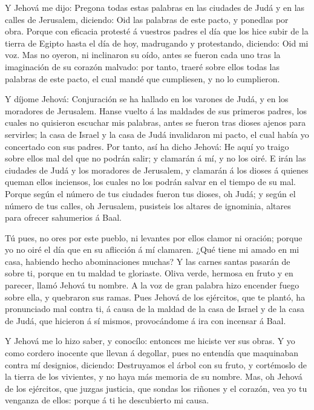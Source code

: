  Y Jehová me dijo: Pregona todas estas palabras en las
ciudades de Judá y en las calles de Jerusalem, diciendo: Oid las
palabras de este pacto, y ponedlas por obra.  Porque con
eficacia protesté á vuestros padres el día que los hice subir de la
tierra de Egipto hasta el día de hoy, madrugando y protestando,
diciendo: Oid mi voz.  Mas no oyeron, ni inclinaron su oído,
antes se fueron cada uno tras la imaginación de su corazón malvado: por
tanto, traeré sobre ellos todas las palabras de este pacto, el cual
mandé que cumpliesen, y no lo cumplieron.

 Y díjome Jehová: Conjuración se ha hallado en los varones
de Judá, y en los moradores de Jerusalem.  Hanse vuelto á
las maldades de sus primeros padres, los cuales no quisieron escuchar
mis palabras, antes se fueron tras dioses ajenos para servirles; la casa
de Israel y la casa de Judá invalidaron mi pacto, el cual había yo
concertado con sus padres.  Por tanto, así ha dicho Jehová:
He aquí yo traigo sobre ellos mal del que no podrán salir; y clamarán á
mí, y no los oiré.  E irán las ciudades de Judá y los
moradores de Jerusalem, y clamarán á los dioses á quienes queman ellos
inciensos, los cuales no los podrán salvar en el tiempo de su mal.
 Porque según el número de tus ciudades fueron tus dioses,
oh Judá; y según el número de tus calles, oh Jerusalem, pusisteis los
altares de ignominia, altares para ofrecer sahumerios á Baal.

 Tú pues, no ores por este pueblo, ni levantes por ellos
clamor ni oración; porque yo no oiré el día que en su aflicción á mí
clamaren.  ¿Qué tiene mi amado en mi casa, habiendo hecho
abominaciones muchas? Y las carnes santas pasarán de sobre ti, porque en
tu maldad te gloriaste.  Oliva verde, hermosa en fruto y en
parecer, llamó Jehová tu nombre. A la voz de gran palabra hizo encender
fuego sobre ella, y quebraron sus ramas.  Pues Jehová de
los ejércitos, que te plantó, ha pronunciado mal contra ti, á causa de
la maldad de la casa de Israel y de la casa de Judá, que hicieron á sí
mismos, provocándome á ira con incensar á Baal.

 Y Jehová me lo hizo saber, y conocílo: entonces me hiciste
ver sus obras.  Y yo como cordero inocente que llevan á
degollar, pues no entendía que maquinaban contra mí designios, diciendo:
Destruyamos el árbol con su fruto, y cortémoslo de la tierra de los
vivientes, y no haya más memoria de su nombre.  Mas, oh
Jehová de los ejércitos, que juzgas justicia, que sondas los riñones y
el corazón, vea yo tu venganza de ellos: porque á ti he descubierto mi
causa.

